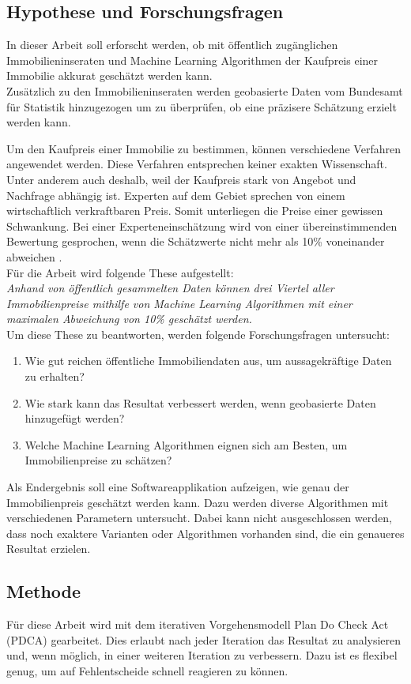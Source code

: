 \subsection{Hypothese und Forschungsfragen}
In dieser Arbeit soll erforscht werden, ob mit öffentlich zugänglichen Immobilieninseraten und Machine Learning Algorithmen der Kaufpreis einer Immobilie akkurat geschätzt werden kann.\\
Zusätzlich zu den Immobilieninseraten werden geobasierte Daten vom Bundesamt für Statistik hinzugezogen um zu überprüfen, ob eine präzisere Schätzung erzielt werden kann.

Um den Kaufpreis einer Immobilie zu bestimmen, können verschiedene Verfahren angewendet werden. Diese Verfahren entsprechen keiner exakten Wissenschaft. Unter anderem auch deshalb, weil der Kaufpreis stark von Angebot und Nachfrage abhängig ist. Experten auf dem Gebiet sprechen von einem wirtschaftlich verkraftbaren Preis. Somit unterliegen die Preise einer gewissen Schwankung. Bei einer Experteneinschätzung wird von einer übereinstimmenden Bewertung gesprochen, wenn die Schätzwerte nicht mehr als 10\% voneinander abweichen \cite{immo_1, immo_2}.\\[2ex]
%
Für die Arbeit wird folgende These aufgestellt:\\[2ex]
\textit{Anhand von öffentlich gesammelten Daten können drei Viertel aller Immobilienpreise mithilfe von Machine Learning Algorithmen mit einer maximalen Abweichung von 10\% geschätzt werden.}\\[4ex]
%
Um diese These zu beantworten, werden folgende Forschungsfragen untersucht:
\begin{enumerate}
\item Wie gut reichen öffentliche Immobiliendaten aus, um aussagekräftige Daten zu erhalten?
\item Wie stark kann das Resultat verbessert werden, wenn geobasierte Daten hinzugefügt werden?
\item Welche Machine Learning Algorithmen eignen sich am Besten, um Immobilienpreise zu schätzen?
\end{enumerate}
Als Endergebnis soll eine Softwareapplikation aufzeigen, wie genau der Immobilienpreis geschätzt werden kann. Dazu werden diverse Algorithmen mit verschiedenen Parametern untersucht. Dabei kann nicht ausgeschlossen werden, dass noch exaktere Varianten oder Algorithmen vorhanden sind, die ein genaueres Resultat erzielen.
%
\subsection{Methode}
Für diese Arbeit wird mit dem iterativen Vorgehensmodell Plan Do Check Act (PDCA) gearbeitet. Dies erlaubt nach jeder Iteration das Resultat zu analysieren und, wenn möglich, in einer weiteren Iteration zu verbessern. Dazu ist es flexibel genug, um auf Fehlentscheide schnell reagieren zu können.
%

